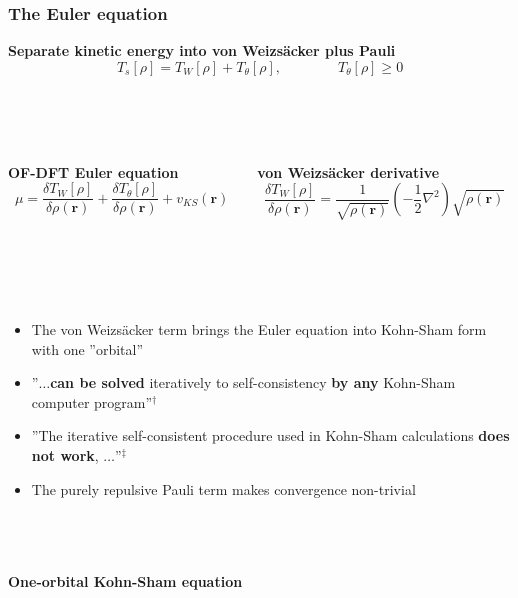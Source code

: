 \documentclass[mathserif, 8pt]{beamer}
\begin{document}
\begin{frame}
    \frametitle{The Euler equation}
    \centering
    \textbf{Separate kinetic energy into von Weizs\"{a}cker plus Pauli}
    \begin{equation}
	\nonumber
	T_s[\rho] = T_W[\rho] + T_\theta[\rho],\qquad \qquad T_\theta[\rho] \geq 0
    \end{equation}
    \ \\
    \ \\
    \ \\
    \begin{columns}
    \begin{column}{.50\textwidth}
	\centering
	\textbf{OF-DFT Euler equation}
	\begin{equation}
	    \nonumber
	    \mu = \frac{\delta T_W[\rho]}{\delta \rho(\boldsymbol{r})} +
	    \frac{\delta T_\theta[\rho]}{\delta\rho(\boldsymbol{r})} + v_{KS}(\boldsymbol{r})
	\end{equation}
    \end{column}
    \begin{column}{.50\textwidth}
	\centering
	\textbf{von Weizs\"{a}cker derivative}
	\begin{equation}
	    \nonumber
	    \frac{\delta T_{W}[\rho]}{\delta\rho(\boldsymbol{r})} = \frac{1}{\sqrt{\rho(\boldsymbol{r})}} 
	    \left(-\frac{1}{2}\nabla^2\right)\sqrt{\rho(\boldsymbol{r})}
	\end{equation}
    \end{column}
    \end{columns}
    \ \\
    \ \\
    \ \\
    \begin{itemize}
	\item	The von Weizs\"{a}cker term brings the Euler equation into Kohn-Sham form with one ''orbital''
	\item	''$\dots$\textbf{can be solved} iteratively to self-consistency \textbf{by any} Kohn-Sham computer program''$^\dag$ 
	\item	''The iterative self-consistent procedure used in Kohn-Sham calculations \textbf{does not work}, $\dots$''$^\ddag$
	\item	The purely repulsive Pauli term makes convergence non-trivial
    \end{itemize}
    \ \\
    \ \\
    \ \\
    \centering
    \textbf{One-orbital Kohn-Sham equation}

\end{frame}
\end{document}
